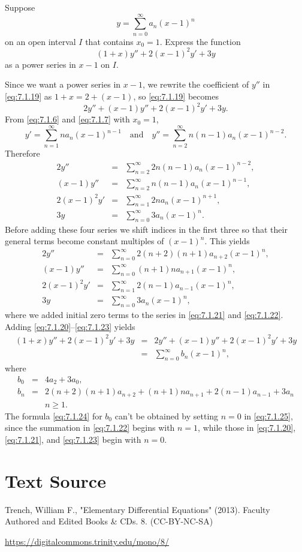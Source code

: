 \documentclass{ximera}
\begin{document}
\begin{example}\label{example:7.1.7}
Suppose
$$
y=\sum_{n=0}^\infty a_n (x-1)^n
$$
 on an open interval $I$ that contains $x_0=1$.
Express the function
\begin{equation} \label{eq:7.1.19}
(1+x)y''+2(x-1)^2y'+3y
\end{equation}
as a power series in $x-1$ on $I$.

\begin{explanation}  Since we want a  power series in $x-1$,
we rewrite the coefficient of $y''$ in \eqref{eq:7.1.19} as
$1+x=2+(x-1)$, so   \eqref{eq:7.1.19} becomes
$$
2y''+(x-1)y''+2(x-1)^2y'+3y.
$$
From \eqref{eq:7.1.6}  and \eqref{eq:7.1.7} with $x_0=1$,
$$
y'=\sum_{n=1}^\infty na_n(x-1)^{n-1}\quad\mbox{and}\quad
y ''=\sum_{n=2}^\infty n(n-1)a_n(x-1)^{n-2}.
$$
Therefore
\begin{eqnarray*}
2y ''&=&\sum_{n=2}^\infty 2n(n-1)a_n(x-1)^{n-2},\\
(x-1)y ''&=&\sum_{n=2}^\infty n(n-1)a_n(x-1)^{n-1},\\
2(x-1)^2y'&=&\sum_{n=1}^\infty2na_n(x-1)^{n+1},\\
3y&=&\sum_{n=0}^\infty 3a_n (x-1)^n.
\end{eqnarray*}
Before adding these four series we shift indices in the first three so
that their general terms become constant multiples of $(x-1)^n$. This
yields
\begin{eqnarray}
2y ''&=&\sum_{n=0}^\infty 2(n+2)(n+1)a_{n+2}(x-1)^n,\label{eq:7.1.20}\\
(x-1)y''&=&\sum_{n=0}^\infty (n+1)na_{n+1}(x-1)^n,
\label{eq:7.1.21}\\
2(x-1)^2y'&=&\sum_{n=1}^\infty 2(n-1)a_{n-1}(x-1)^n,\label{eq:7.1.22}\\
3y&=&\sum_{n=0}^\infty 3a_n (x-1)^n, \label{eq:7.1.23}
\end{eqnarray}
where we added initial zero terms to the series in \eqref{eq:7.1.21}
and \eqref{eq:7.1.22}.  Adding \eqref{eq:7.1.20}--\eqref{eq:7.1.23} yields
\begin{eqnarray*}
(1+x)y''+2(x-1)^2y'+3y&=&2y''+(x-1)y''+2(x-1)^2y'+3y\\[5pt]
&=&\sum_{n=0}^\infty  b_n (x-1)^n,
\end{eqnarray*}
where
\begin{eqnarray}
b_0&=&4a_2+3a_0, \label{eq:7.1.24}\\
b_n&=&2(n+2)(n+1)a_{n+2}+(n+1)na_{n+1}+2(n-1)a_{n-1}+3a_n\nonumber
\\
&&n\geq 1\label{eq:7.1.25}.
\end{eqnarray}
The formula \eqref{eq:7.1.24} for $b_0$  can't be obtained by
setting $n=0$ in \eqref{eq:7.1.25}, since the summation in \eqref{eq:7.1.22}
begins with $n=1$,  while those in \eqref{eq:7.1.20}, \eqref{eq:7.1.21},
and \eqref{eq:7.1.23} begin with $n=0$.
\end{explanation}
\end{example}



\section*{Text Source}
Trench, William F., "Elementary Differential Equations" (2013). Faculty Authored and Edited Books \& CDs. 8. (CC-BY-NC-SA)

\href{https://digitalcommons.trinity.edu/mono/8/}{https://digitalcommons.trinity.edu/mono/8/}
\end{document}
